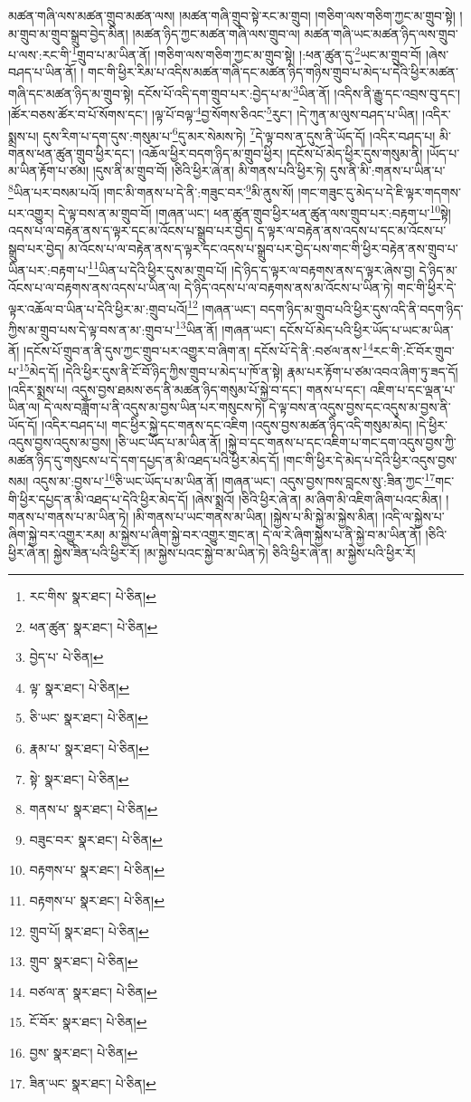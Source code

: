 མཚན་གཞི་ལས་མཚན་གྲུབ་མཚན་ལས། །མཚན་གཞི་གྲུབ་སྟེ་རང་མ་གྲུབ། །གཅིག་ལས་གཅིག་ཀྱང་མ་གྲུབ་སྟེ། །མ་གྲུབ་མ་གྲུབ་སྒྲུབ་བྱེད་མིན། །མཚན་ཉིད་ཀྱང་མཚན་གཞི་ལས་གྲུབ་ལ། མཚན་གཞི་ཡང་མཚན་ཉིད་ལས་གྲུབ་པ་ལས་:རང་གི་\footnote{རང་གིས་  སྣར་ཐང་།  པེ་ཅིན། }གྲུབ་པ་མ་ཡིན་ནོ། །གཅིག་ལས་གཅིག་ཀྱང་མ་གྲུབ་སྟེ། །:ཕན་ཚུན་དུ་\footnote{ཕན་ཚུན་  སྣར་ཐང་།  པེ་ཅིན། }ཡང་མ་གྲུབ་བོ། །ཞེས་བཤད་པ་ཡིན་ནོ། །
གང་གི་ཕྱིར་རིམ་པ་འདིས་མཚན་གཞི་དང་མཚན་ཉིད་གཉིས་གྲུབ་པ་མེད་པ་དེའི་ཕྱིར་མཚན་གཞི་དང་མཚན་ཉིད་མ་གྲུབ་སྟེ། དངོས་པོ་འདི་དག་གྲུབ་པར་:བྱེད་པ་མ་\footnote{བྱེད་པ་  པེ་ཅིན། }ཡིན་ནོ། །འདིས་ནི་རྒྱུ་དང་འབྲས་བུ་དང་། །ཚོར་བཅས་ཚོར་བ་པོ་སོགས་དང་། །ལྟ་པོ་བལྟ་\footnote{ལྟ་  སྣར་ཐང་།  པེ་ཅིན། }བྱ་སོགས་ཅིའང་\footnote{ཅི་ཡང་  སྣར་ཐང་།  པེ་ཅིན། }རུང་། །དེ་ཀུན་མ་ལུས་བཤད་པ་ཡིན། །འདིར་སྨྲས་པ། དུས་རིག་པ་དག་དུས་:གསུམ་པ་\footnote{རྣམ་པ་  སྣར་ཐང་།  པེ་ཅིན། }དུ་མར་སེམས་ཏེ། \footnote{སྟེ་  སྣར་ཐང་།  པེ་ཅིན། }དེ་ལྟ་བས་ན་དུས་ནི་ཡོད་དོ། །འདིར་བཤད་པ། མི་གནས་ཕན་ཚུན་གྲུབ་ཕྱིར་དང་། །འཆོལ་ཕྱིར་བདག་ཉིད་མ་གྲུབ་ཕྱིར། །དངོས་པོ་མེད་ཕྱིར་དུས་གསུམ་ནི། །ཡོད་པ་མ་ཡིན་རྟོག་པ་ཙམ། །དུས་ནི་མ་གྲུབ་བོ། །ཅིའི་ཕྱིར་ཞེ་ན། མི་གནས་པའི་ཕྱིར་ཏེ། དུས་ནི་མི་:གནས་པ་ཡིན་པ་\footnote{གནས་པ་  སྣར་ཐང་།  པེ་ཅིན། }ཡིན་པར་བསམ་པའོ། །གང་མི་གནས་པ་དེ་ནི་:གཟུང་བར་\footnote{བཟུང་བར་  སྣར་ཐང་།  པེ་ཅིན། }མི་ནུས་སོ། །གང་གཟུང་དུ་མེད་པ་དེ་ཇི་ལྟར་གདགས་པར་འགྱུར། དེ་ལྟ་བས་ན་མ་གྲུབ་བོ། །གཞན་ཡང་། ཕན་ཚུན་གྲུབ་ཕྱིར་ཕན་ཚུན་ལས་གྲུབ་པར་:བརྟག་པ་\footnote{བརྟགས་པ་  སྣར་ཐང་།  པེ་ཅིན། }སྟེ། འདས་པ་ལ་བརྟེན་ནས་ད་ལྟར་དང་མ་འོངས་པ་སྒྲུབ་པར་བྱེད། ད་ལྟར་ལ་བརྟེན་ནས་འདས་པ་དང་མ་འོངས་པ་སྒྲུབ་པར་བྱེད། མ་འོངས་པ་ལ་བརྟེན་ནས་ད་ལྟར་དང་འདས་པ་སྒྲུབ་པར་བྱེད་པས་གང་གི་ཕྱིར་བརྟེན་ནས་གྲུབ་པ་ཡིན་པར་:བརྟག་པ་\footnote{བརྟགས་པ་  སྣར་ཐང་།  པེ་ཅིན། }ཡིན་པ་དེའི་ཕྱིར་དུས་མ་གྲུབ་པོ། །དེ་ཉིད་ད་ལྟར་ལ་བརྟགས་ནས་ད་ལྟར་ཞེས་བྱ། དེ་ཉིད་མ་འོངས་པ་ལ་བརྟགས་ནས་འདས་པ་ཡིན་ལ། དེ་ཉིད་འདས་པ་ལ་བརྟགས་ནས་མ་འོངས་པ་ཡིན་ཏེ། གང་གི་ཕྱིར་དེ་ལྟར་འཆོལ་བ་ཡིན་པ་དེའི་ཕྱིར་མ་:གྲུབ་པའོ།\footnote{གྲུབ་པོ།  སྣར་ཐང་།  པེ་ཅིན། } །གཞན་ཡང་། བདག་ཉིད་མ་གྲུབ་པའི་ཕྱིར་དུས་འདི་ནི་བདག་ཉིད་ཀྱིས་མ་གྲུབ་པས་དེ་ལྟ་བས་ན་མ་:གྲུབ་པ་\footnote{གྲུབ་  སྣར་ཐང་།  པེ་ཅིན། }ཡིན་ནོ། །གཞན་ཡང་། དངོས་པོ་མེད་པའི་ཕྱིར་ཡོད་པ་ཡང་མ་ཡིན་ནོ། །དངོས་པོ་གྲུབ་ན་ནི་དུས་ཀྱང་གྲུབ་པར་འགྱུར་བ་ཞིག་ན། དངོས་པོ་དེ་ནི་:བཙལ་ནས་\footnote{བཙལ་ན་  སྣར་ཐང་།  པེ་ཅིན། }རང་གི་:ངོ་བོར་གྲུབ་པ་\footnote{ངོ་བོར་  སྣར་ཐང་།  པེ་ཅིན། }མེད་དོ། །དེའི་ཕྱིར་དུས་ནི་ངོ་བོ་ཉིད་ཀྱིས་གྲུབ་པ་མེད་པ་ཁོ་ན་སྟེ། རྣམ་པར་རྟོག་པ་ཙམ་འབའ་ཞིག་ཏུ་ཟད་དོ། །འདིར་སྨྲས་པ། འདུས་བྱས་ཐམས་ཅད་ནི་མཚན་ཉིད་གསུམ་པོ་སྐྱེ་བ་དང་། གནས་པ་དང་། འཇིག་པ་དང་ལྡན་པ་ཡིན་ལ། དེ་ལས་བཟློག་པ་ནི་འདུས་མ་བྱས་ཡིན་པར་གསུངས་ཏེ། དེ་ལྟ་བས་ན་འདུས་བྱས་དང་འདུས་མ་བྱས་ནི་ཡོད་དོ། །འདིར་བཤད་པ། གང་ཕྱིར་སྐྱེ་དང་གནས་དང་འཇིག །འདུས་བྱས་མཚན་ཉིད་འདི་གསུམ་མེད། །དེ་ཕྱིར་འདུས་བྱས་འདུས་མ་བྱས། །ཅི་ཡང་ཡོད་པ་མ་ཡིན་ནོ། །སྐྱེ་བ་དང་གནས་པ་དང་འཇིག་པ་གང་དག་འདུས་བྱས་ཀྱི་མཚན་ཉིད་དུ་གསུངས་པ་དེ་དག་དཔྱད་ན་མི་འཐད་པའི་ཕྱིར་མེད་དོ། །གང་གི་ཕྱིར་དེ་མེད་པ་དེའི་ཕྱིར་འདུས་བྱས་སམ། འདུས་མ་:བྱས་པ་\footnote{བྱས་  སྣར་ཐང་།  པེ་ཅིན། }ཅི་ཡང་ཡོད་པ་མ་ཡིན་ནོ། །གཞན་ཡང་། འདུས་བྱས་ཁས་བླངས་སུ་:ཟིན་ཀྱང་\footnote{ཟིན་ཡང་  སྣར་ཐང་།  པེ་ཅིན། }གང་གི་ཕྱིར་དཔྱད་ན་མི་འཐད་པ་དེའི་ཕྱིར་མེད་དོ། །ཞེས་སྨྲའོ། །ཅིའི་ཕྱིར་ཞེ་ན། མ་ཞིག་མི་འཇིག་ཞིག་པའང་མིན། །གནས་པ་གནས་པ་མ་ཡིན་ཏེ། །མི་གནས་པ་ཡང་གནས་མ་ཡིན། །སྐྱེས་པ་མི་སྐྱེ་མ་སྐྱེས་མིན། །འདི་ལ་སྐྱེས་པ་ཞིག་སྐྱེ་བར་འགྱུར་རམ། མ་སྐྱེས་པ་ཞིག་སྐྱེ་བར་འགྱུར་གྲང་ན། དེ་ལ་རེ་ཞིག་སྐྱེས་པ་ནི་སྐྱེ་བ་མ་ཡིན་ནོ། །ཅིའི་ཕྱིར་ཞེ་ན། སྐྱེས་ཟིན་པའི་ཕྱིར་རོ། །མ་སྐྱེས་པའང་སྐྱེ་བ་མ་ཡིན་ཏེ། ཅིའི་ཕྱིར་ཞེ་ན། མ་སྐྱེས་པའི་ཕྱིར་རོ། 